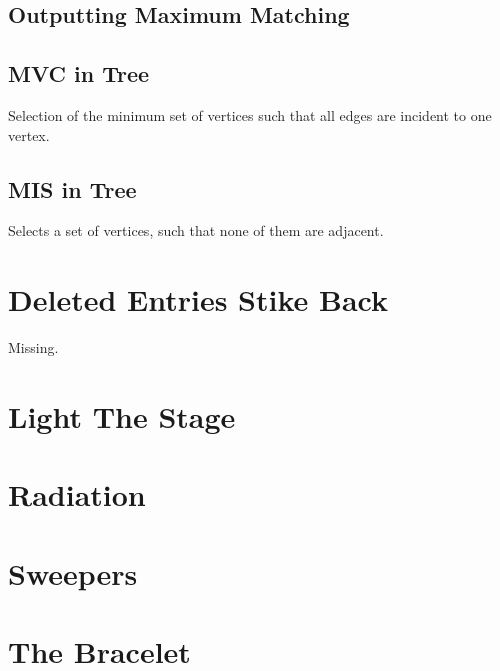 \documentclass[a4paper, 10pt]{article}
\let\stdsection\section
\renewcommand\section{\newpage\stdsection}
\newcommand{\includecode}[1]{
    }
\begin{document}
        \subsection{Outputting Maximum Matching}
        \includecode{../problems/w11/Connecting_Capitals/MaximumMatchingTreeOutput.cpp}
        
        \subsection{MVC in Tree}
        Selection of the minimum set of vertices such that all edges are incident to one vertex.
        \includecode{../problems/w11/Connecting_Capitals/MinimumVertexCoverTree.cpp}
        
        \subsection{MIS in Tree}
        Selects a set of vertices, such that none of them are adjacent.
        \includecode{../problems/w11/Connecting_Capitals/MaximumIndependentSetTree.cpp}
          
    
    \section{Deleted Entries Stike Back}
        Missing.
        
    \section{Light The Stage}
        \includecode{../problems/w12/LightTheStage/LightTheStage1.cpp}
        
    \section{Radiation}
        \includecode{../problems/w12/Radiation/Radiation1.cpp}
        
    \section{Sweepers}
        \includecode{../problems/w12/Sweepers/Sweepers1.cpp}
        
    \section{The Bracelet}
        \includecode{../problems/w12/The_Bracelet/Bracelet1.cpp}
        
\end{document}
